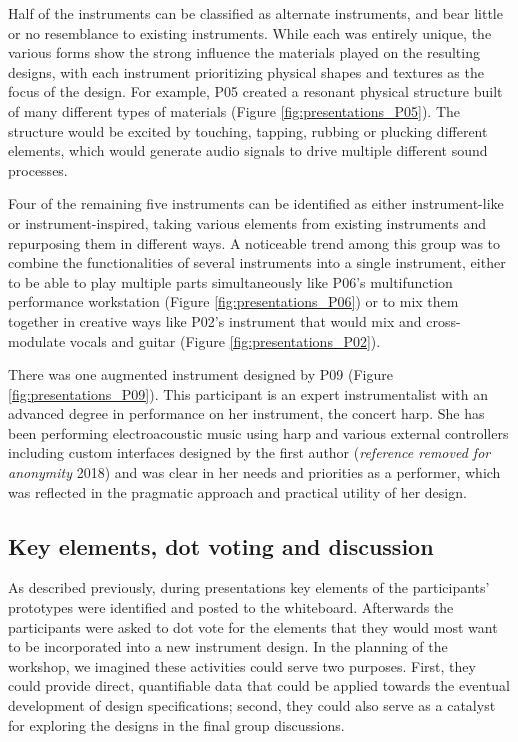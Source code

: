 \documentclass[letterpaper, 12pt]{article}
\begin{document}
Half of the instruments can be classified as alternate instruments, and bear little or no resemblance to existing instruments. While each was entirely unique, the various forms show the strong influence the materials played on the resulting designs, with each instrument prioritizing physical shapes and textures as the focus of the design. For example, P05 created a resonant physical structure built of many different types of materials (Figure \ref{fig:presentations_P05}). The structure would be excited by touching, tapping, rubbing or plucking different elements, which would generate audio signals to drive multiple different sound processes.

Four of the remaining five instruments can be identified as either instrument-like or instrument-inspired, taking various elements from existing instruments and repurposing them in different ways. A noticeable trend among this group was to combine the functionalities of several instruments into a single instrument, either to be able to play multiple parts simultaneously like P06's multifunction performance workstation (Figure \ref{fig:presentations_P06}) or to mix them together in creative ways like P02's instrument that would mix and cross-modulate vocals and guitar (Figure \ref{fig:presentations_P02}). 

There was one augmented instrument designed by P09 (Figure \ref{fig:presentations_P09}). This participant is an expert instrumentalist with an advanced degree in performance on her instrument, the concert harp. She has been performing electroacoustic music using harp and various external controllers including custom interfaces designed by the first author 
(\emph{reference removed for anonymity} 2018)
and was clear in her needs and priorities as a performer, which was reflected in the pragmatic approach and practical utility of her design. 

\subsection{Key elements, dot voting and discussion}

As described previously, during presentations key elements of the participants' prototypes were identified and posted to the whiteboard. Afterwards the participants were asked to dot vote for the elements that they would most want to be incorporated into a new instrument design. In the planning of the workshop, we imagined these activities could serve two purposes. First, they could provide direct, quantifiable data that could be applied towards the eventual development of design specifications; second, they could also serve as a catalyst for exploring the designs in the final group discussions.
\end{document}
